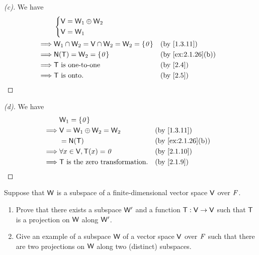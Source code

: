 \begin{proof}[(c)]
  We have
  \begin{align*}
             & \begin{dcases}
                 \V = \W_1 \oplus \W_2 \\
                 \V = \W_1
               \end{dcases}                                                   \\
    \implies & \W_1 \cap \W_2 = \V \cap \W_2 = \W_2 = \set{\zv} &  & \by{1.3.11}       \\
    \implies & \ns{\T} = \W_2 = \set{\zv}                       &  & \by{ex:2.1.26}[b] \\
    \implies & \T \text{ is one-to-one}                         &  & \by{2.4}          \\
    \implies & \T \text{ is onto}.                              &  & \by{2.5}
  \end{align*}
\end{proof}

\begin{proof}[(d)]
  We have
  \begin{align*}
             & \W_1 = \set{\zv}                                              \\
    \implies & \V = \W_1 \oplus \W_2 = \W_2           &  & \by{1.3.11}       \\
             & = \ns{\T}                              &  & \by{ex:2.1.26}[b] \\
    \implies & \forall x \in \V, \T(x) = \zv          &  & \by{2.1.10}       \\
    \implies & \T \text{ is the zero transformation}. &  & \by{2.1.9}
  \end{align*}
\end{proof}

\begin{ex}\label{ex:2.1.27}
  Suppose that \(\mathsf{W}\) is a subspace of a finite-dimensional vector space \(\mathsf{V}\) over \(\mathit{F}\).
  \begin{enumerate}
    \item Prove that there exists a subspace \(\mathsf{W}'\) and a function \(\mathsf{T} : \mathsf{V} \to \mathsf{V}\) such that \(\mathsf{T}\) is a projection on \(\mathsf{W}\) along \(\mathsf{W}'\).
    \item Give an example of a subspace \(\mathsf{W}\) of a vector space \(\mathsf{V}\) over \(\mathit{F}\) such that there are two projections on \(\mathsf{W}\) along two (distinct) subspaces.
  \end{enumerate}
\end{ex}

